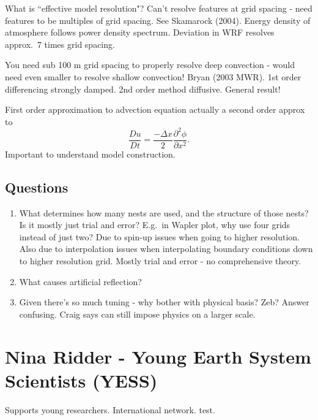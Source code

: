 \documentclass[12pt]{article}
\begin{document}
What is ``effective model resolution"? Can't resolve features at grid spacing - need features to be multiples of grid spacing. See Skamarock (2004). Energy density of atmosphere follows power density spectrum. Deviation in WRF resolves approx.~7 times grid spacing. 

You need sub 100 m grid spacing to properly resolve deep convection - would need even smaller to resolve shallow convection! Bryan (2003 MWR). 1st order differencing strongly damped. 2nd order method diffusive. General result!

First order approximation to advection equation actually a second order approx to 
$$\frac{D u}{Dt} = \frac{-\Delta x}{2} \frac{\partial^2 \phi}{\partial x^2}.$$
Important to understand model construction.

\subsection{Questions}
\begin{enumerate}
\item
What determines how many nests are used, and the structure of those nests? Is it mostly just trial and error? E.g.~in Wapler plot, why use four grids instead of just two? Due to spin-up issues when going to higher resolution. Also due to interpolation issues when interpolating boundary conditions down to higher resolution grid. Mostly trial and error - no comprehensive theory. 
\item
What causes artificial reflection?
\item
Given there's so much tuning - why bother with physical basis? Zeb? Answer confusing. Craig says can still impose physics on a larger scale. 
\end{enumerate}

\section{Nina Ridder - Young Earth System Scientists (YESS)}
Supports young researchers. International network. test.



\end{document}

